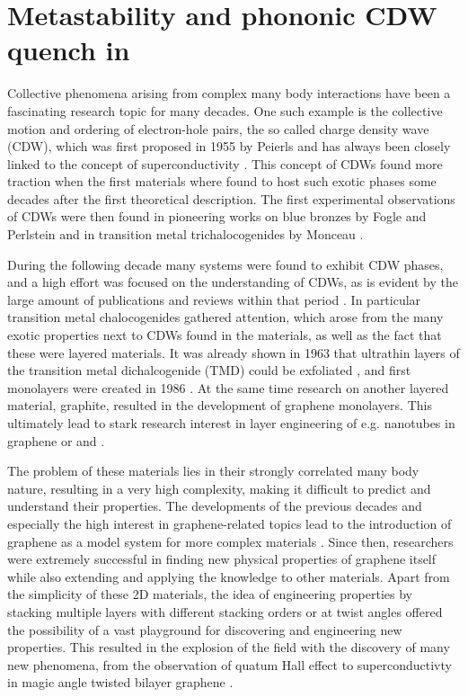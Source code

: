 \chapter{Metastability and phononic CDW quench in }

Collective phenomena arising from complex many body interactions have been a fascinating research topic for many decades.
One such example is the collective motion and ordering of electron-hole pairs, the so called charge density wave (CDW), which was first proposed in 1955 by Peierls \cite{peierls_quantum_1996} and has always been closely linked to the concept of superconductivity \cite{frohlich_theory_1997}.
This concept of CDWs found more traction when the first materials where found to host such exotic phases some decades after the first theoretical description.
The first experimental observations of CDWs were then found in pioneering works on blue bronzes by Fogle and Perlstein \cite{fogle_semiconductor--metal_1972} and in transition metal trichalocogenides by Monceau \cite{monceau_electric_1976}.

During the following decade many systems were found to exhibit CDW phases, and a high effort was focused on the understanding of CDWs, as is evident by the large amount of publications and reviews within that period \cite{wilson_questions_1978,gruner_dynamics_1988,yoffe_electronic_1990,wilson_charge-density_2001}.
In particular transition metal chalocogenides gathered attention, which arose from the many exotic properties next to CDWs found in the materials, as well as the fact that these were layered materials.
It was already shown in 1963 that ultrathin layers of the transition metal dichalcogenide (TMD)  could be exfoliated \cite{frindt_physical_1997}, and first monolayers were created in 1986 \cite{joensen_single-layer_1986}.
At the same time research on another layered material, graphite, resulted in the development of graphene monolayers.
This ultimately lead to stark research interest in layer engineering of e.g. nanotubes in graphene or  and  \cite{iijima_helical_1991,tenne_polyhedral_1992,feldman_high-rate_1995}.

The problem of these materials lies in their strongly correlated many body nature, resulting in a very high complexity, making it difficult to predict and understand their properties.
The developments of the previous decades and especially the high interest in graphene-related topics lead to the introduction of graphene as a model system for more complex materials \cite{novoselov_electric_2004, novoselov_two-dimensional_2005, geim_rise_2007}.
Since then, researchers were extremely successful in finding new physical properties of graphene itself while also extending and applying the knowledge to other materials.
Apart from the simplicity of these 2D materials, the idea of engineering properties by stacking multiple layers with different stacking orders or at twist angles offered the possibility of a vast playground for discovering and engineering new properties.
This resulted in the explosion of the field with the discovery of many new phenomena, from the observation of quatum Hall effect \cite{zhang_experimental_2005} to superconductivty in magic angle twisted bilayer graphene \cite{cao_unconventional_2018}.

